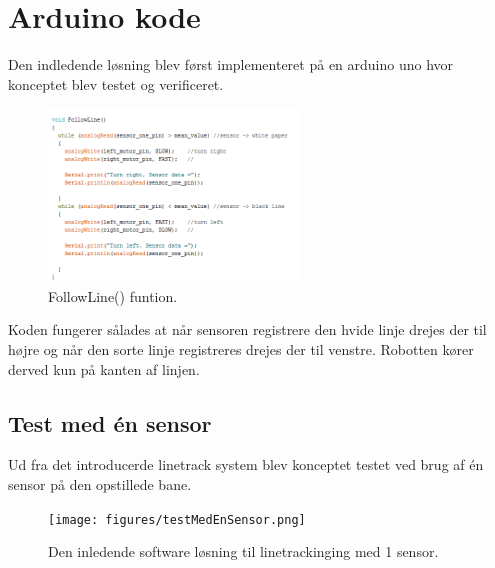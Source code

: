 \section{Arduino kode}
Den indledende løsning blev først implementeret på en arduino uno hvor konceptet blev testet og verificeret.

\begin{figure}[h!]
  \centering
  \includegraphics[width=0.6\textwidth]{figures/followLine2.png}
  \caption{FollowLine() funtion.}
  \label{follow_line_kode}
\end{figure}

Koden fungerer sålades at  når sensoren registrere den hvide linje drejes der til højre og når den sorte linje registreres drejes der til venstre. Robotten kører derved kun på kanten af linjen.

\subsection{Test med én sensor}
Ud fra det introducerde linetrack system blev konceptet testet ved brug af én sensor på den opstillede bane. 

\begin{figure}[h!]
  \centering
  \texttt{[image: figures/testMedEnSensor.png]}
  \caption{Den inledende software løsning til linetrackinging med 1 sensor.}
  \label{init_software}
\end{figure}


